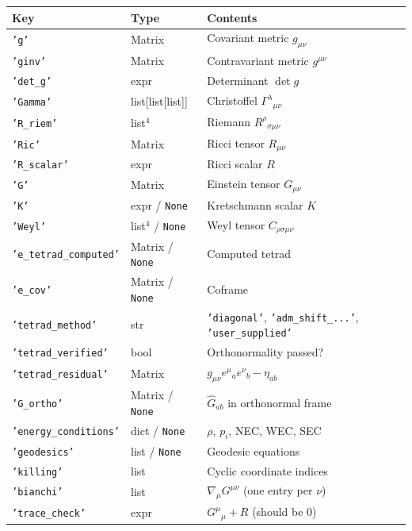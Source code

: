 \documentclass[11pt,a4paper]{article}
\newcommand{\code}[1]{\texttt{\small#1}}
\renewcommand{\Gamma}{\varGamma}
\begin{document}
\begin{center}
\begin{longtable}{lll}
  \toprule
  Key & Type & Contents \\
  \midrule\endhead
  \code{'g'} & Matrix & Covariant metric $g_{\mu\nu}$ \\
  \code{'ginv'} & Matrix & Contravariant metric $g^{\mu\nu}$ \\
  \code{'det\_g'} & expr & Determinant $\det g$ \\
  \code{'Gamma'} & list[list[list]] & Christoffel $\Gamma^\lambda{}_{\mu\nu}$ \\
  \code{'R\_riem'} & list$^4$ & Riemann $R^\rho{}_{\sigma\mu\nu}$ \\
  \code{'Ric'} & Matrix & Ricci tensor $R_{\mu\nu}$ \\
  \code{'R\_scalar'} & expr & Ricci scalar $R$ \\
  \code{'G'} & Matrix & Einstein tensor $G_{\mu\nu}$ \\
  \code{'K'} & expr / \code{None} & Kretschmann scalar $K$ \\
  \code{'Weyl'} & list$^4$ / \code{None} & Weyl tensor $C_{\rho\sigma\mu\nu}$ \\
  \code{'e\_tetrad\_computed'} & Matrix / \code{None} & Computed tetrad \\
  \code{'e\_cov'} & Matrix / \code{None} & Coframe \\
  \code{'tetrad\_method'} & str & \code{'diagonal'}, \code{'adm\_shift\_...'},
                                   \code{'user\_supplied'} \\
  \code{'tetrad\_verified'} & bool & Orthonormality passed? \\
  \code{'tetrad\_residual'} & Matrix & $g_{\mu\nu}e^\mu{}_a e^\nu{}_b - \eta_{ab}$ \\
  \code{'G\_ortho'} & Matrix / \code{None} & $\hat{G}_{ab}$ in orthonormal frame \\
  \code{'energy\_conditions'} & dict / \code{None} & $\rho$, $p_i$, NEC, WEC, SEC \\
  \code{'geodesics'} & list / \code{None} & Geodesic equations \\
  \code{'killing'} & list & Cyclic coordinate indices \\
  \code{'bianchi'} & list & $\nabla_\mu G^{\mu\nu}$ (one entry per $\nu$) \\
  \code{'trace\_check'} & expr & $G^\mu{}_\mu + R$ (should be $0$) \\
  \bottomrule
\end{longtable}
\end{center}
\end{document}
